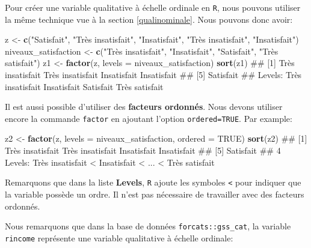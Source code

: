 \documentclass[]{book}
\newenvironment{Shaded}{\begin{snugshade}}{\end{snugshade}}
\newcommand{\DataTypeTok}[1]{\textcolor[rgb]{0.13,0.29,0.53}{#1}}
\newcommand{\KeywordTok}[1]{\textcolor[rgb]{0.13,0.29,0.53}{\textbf{#1}}}
\newcommand{\NormalTok}[1]{#1}
\newcommand{\OtherTok}[1]{\textcolor[rgb]{0.56,0.35,0.01}{#1}}
\newcommand{\StringTok}[1]{\textcolor[rgb]{0.31,0.60,0.02}{#1}}
\theoremstyle{definition}
\theoremstyle{definition}
\theoremstyle{definition}
\theoremstyle{remark}
\begin{document}
Pour créer une variable qualitative à échelle ordinale en \texttt{R},
nous pouvons utiliser la même technique vue à la section
\ref{qualinominale}. Nous pouvons donc avoir:

\begin{Shaded}
\begin{Highlighting}[]
\NormalTok{z <-}\StringTok{ }\KeywordTok{c}\NormalTok{(}\StringTok{"Satisfait"}\NormalTok{, }\StringTok{"Très insatisfait"}\NormalTok{, }\StringTok{"Insatisfait"}\NormalTok{, }\StringTok{"Très insatisfait"}\NormalTok{, }\StringTok{"Insatisfait"}\NormalTok{)}
\NormalTok{niveaux_satisfaction <-}\StringTok{ }\KeywordTok{c}\NormalTok{(}\StringTok{"Très insatisfait"}\NormalTok{, }\StringTok{"Insatisfait"}\NormalTok{, }\StringTok{"Satisfait"}\NormalTok{, }\StringTok{"Très satisfait"}\NormalTok{)}
\NormalTok{z1 <-}\StringTok{ }\KeywordTok{factor}\NormalTok{(z, }\DataTypeTok{levels =}\NormalTok{ niveaux_satisfaction)}
\KeywordTok{sort}\NormalTok{(z1)}
\NormalTok{## [1] Très insatisfait Très insatisfait Insatisfait      Insatisfait     }
\NormalTok{## [5] Satisfait       }
\NormalTok{## Levels: Très insatisfait Insatisfait Satisfait Très satisfait}
\end{Highlighting}
\end{Shaded}

Il est aussi possible d'utiliser des \textbf{facteurs ordonnés}. Nous
devons utiliser encore la commande \texttt{factor} en ajoutant l'option
\texttt{ordered=TRUE}. Par example:

\begin{Shaded}
\begin{Highlighting}[]
\NormalTok{z2 <-}\StringTok{ }\KeywordTok{factor}\NormalTok{(z, }\DataTypeTok{levels =}\NormalTok{ niveaux_satisfaction, }\DataTypeTok{ordered =} \OtherTok{TRUE}\NormalTok{)}
\KeywordTok{sort}\NormalTok{(z2)}
\NormalTok{## [1] Très insatisfait Très insatisfait Insatisfait      Insatisfait     }
\NormalTok{## [5] Satisfait       }
\NormalTok{## 4 Levels: Très insatisfait < Insatisfait < ... < Très satisfait}
\end{Highlighting}
\end{Shaded}

Remarquons que dans la liste \textbf{Levels}, \texttt{R} ajoute les
symboles \texttt{\textless{}} pour indiquer que la variable possède un
ordre. Il n'est pas nécessaire de travailler avec des facteurs ordonnés.

Nous remarquons que dans la base de données \texttt{forcats::gss\_cat},
la variable \texttt{rincome} représente une variable qualitative à
échelle ordinale:
\end{document}
